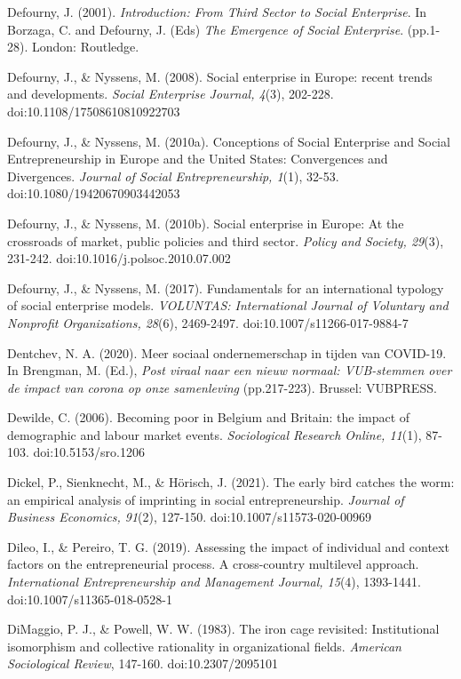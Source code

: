 \documentclass{article}
\begin{document}
Defourny, J. (2001). \emph{Introduction: From Third Sector to Social Enterprise}. In Borzaga, C. and Defourny, J. (Eds) \emph{The Emergence of Social Enterprise}. (pp.1-28). London: Routledge.

Defourny, J., \& Nyssens, M. (2008). Social enterprise in Europe: recent trends and developments. \emph{Social Enterprise Journal, 4}(3), 202-228. doi:10.1108/17508610810922703

Defourny, J., \& Nyssens, M. (2010a). Conceptions of Social Enterprise and Social Entrepreneurship in Europe and the United States: Convergences and Divergences. \emph{Journal of Social Entrepreneurship, 1}(1), 32-53. doi:10.1080/19420670903442053

Defourny, J., \& Nyssens, M. (2010b). Social enterprise in Europe: At the crossroads of market, public policies and third sector. \emph{Policy and Society, 29}(3), 231-242. doi:10.1016/j.polsoc.2010.07.002

Defourny, J., \& Nyssens, M. (2017). Fundamentals for an international typology of social enterprise models. \emph{VOLUNTAS: International Journal of Voluntary and }\emph{Nonprofit}\emph{ Organizations, 28}(6), 2469-2497. doi:10.1007/s11266-017-9884-7

Dentchev, N. A. (2020). Meer sociaal ondernemerschap in tijden van COVID-19. In Brengman, M. (Ed.), \emph{Post viraal}\emph{ naar een nieuw normaal: VUB-stemmen over de impact van corona op onze samenleving} (pp.217-223). Brussel: VUBPRESS.

Dewilde, C. (2006). Becoming poor in Belgium and Britain: the impact of demographic and labour market events. \emph{Sociological Research Online, 11}(1), 87-103. doi:10.5153/sro.1206

Dickel, P., Sienknecht, M., \& Hörisch, J. (2021). The early bird catches the worm: an empirical analysis of imprinting in social entrepreneurship. \emph{Journal of Business Economics, 91}(2), 127-150. doi:10.1007/s11573-020-00969

Dileo, I., \& Pereiro, T. G. (2019). Assessing the impact of individual and context factors on the entrepreneurial process. A cross-country multilevel approach. \emph{International Entrepreneurship and Management Journal, 15}(4), 1393-1441. doi:10.1007/s11365-018-0528-1

DiMaggio, P. J., \& Powell, W. W. (1983). The iron cage revisited: Institutional isomorphism and collective rationality in organizational fields. \emph{American Sociological Review}, 147-160. doi:10.2307/2095101
\end{document}
